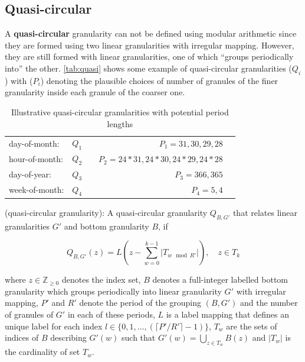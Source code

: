 \documentclass[12pt]{article}
\begin{document}
\hypertarget{sec:quasi-circular-gran-def}{%
\subsection{Quasi-circular}\label{sec:quasi-circular-gran-def}}

A \textbf{quasi-circular} granularity can not be defined using modular arithmetic since they are formed using two linear granularities with irregular mapping. However, they are still formed with linear granularities, one of which ``groups periodically into'' the other. \autoref{tab:quasi} shows some example of quasi-circular granularities (\(Q_i\)) with (\(P_i\)) denoting the plausible choices of number of granules of the finer granularity inside each granule of the coarser one.

\begin{table}[ht]
\begin{center}
\begin{tabular}{lr@{~}lr@{~}r}
\toprule

day-of-month: & $Q_1$ && $P_1 = 31, 30, 29, 28$\\
hour-of-month: & $Q_2$ && $P_2 = 24*31, 24*30, 24*29, 24*28$\\
day-of-year: & $Q_3$ && $P_3 = 366, 365$\\
week-of-month: & $Q_4$ && $P_4 = 5, 4$\\ 
\bottomrule
\end{tabular}
\end{center}
\caption{Illustrative quasi-circular granularities with potential period lengths}
\label{tab:quasi}
\end{table}

\begin{definition}\label{def:quasicircular}
(quasi-circular granularity): A quasi-circular granularity $Q_{B, G'}$ that relates linear granularities $G'$ and bottom granularity $B$, if

\begin{equation}\label{eq:quasi}
Q_{B, G'}(z) = L(z - \sum_{w=0}^{k-1}\vert T_{w \mod R'} \vert), \quad z \in T_k
\end{equation}

where
$z \in \mathbb{Z}_{\geq 0}$ denotes the index set,
$B$ denotes a full-integer labelled bottom granularity which groups periodically into linear granularity $G'$ with irregular mapping, $P'$ and $R'$ denote the period of the grouping $(B, G')$ and the number of granules of $G'$ in each of these periods, ${L}$ is a label mapping that defines an unique label for each index $l \in \{0,1,\dots, (\lceil P'/R' \rceil-1)\}$, $T_w$ are the sets of indices of $B$ describing $G'(w)$ such that  $G'(w) = \bigcup_{z \in T_w}B(z)$ and $\vert T_w \vert$ is the cardinality of set $T_w$.
\end{definition}
\end{document}

